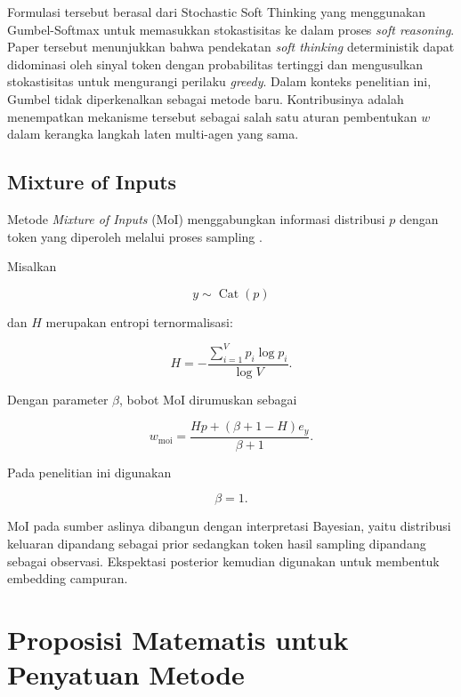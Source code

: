 Formulasi tersebut berasal dari Stochastic Soft Thinking yang menggunakan Gumbel-Softmax untuk memasukkan stokastisitas ke dalam proses \textit{soft reasoning}. Paper tersebut menunjukkan bahwa pendekatan \textit{soft thinking} deterministik dapat didominasi oleh sinyal token dengan probabilitas tertinggi dan mengusulkan stokastisitas untuk mengurangi perilaku \textit{greedy}.
Dalam konteks penelitian ini, Gumbel tidak diperkenalkan sebagai metode baru. Kontribusinya adalah menempatkan mekanisme tersebut sebagai salah satu aturan pembentukan \(w\) dalam kerangka langkah laten multi-agen yang sama.

\subsection{Mixture of Inputs}

Metode \textit{Mixture of Inputs} (MoI) menggabungkan informasi distribusi \(p\) dengan token yang diperoleh melalui proses sampling \citep{moi}.

Misalkan

\begin{equation}
y\sim\operatorname{Cat}(p)
\end{equation}

dan \(H\) merupakan entropi ternormalisasi:

\begin{equation}
H
=
-\frac{
\sum_{i=1}^{V}p_i\log p_i
}{
\log V
}.
\end{equation}

Dengan parameter \(\beta\), bobot MoI dirumuskan sebagai

\begin{equation}
w_{\mathrm{moi}}
=
\frac{
Hp+(\beta+1-H)e_y
}{
\beta+1
}.
\end{equation}

Pada penelitian ini digunakan

\begin{equation}
\beta=1.
\end{equation}

MoI pada sumber aslinya dibangun dengan interpretasi Bayesian, yaitu distribusi keluaran dipandang sebagai prior sedangkan token hasil sampling dipandang sebagai observasi. Ekspektasi posterior kemudian digunakan untuk membentuk embedding campuran.

\section{Proposisi Matematis untuk Penyatuan Metode}

